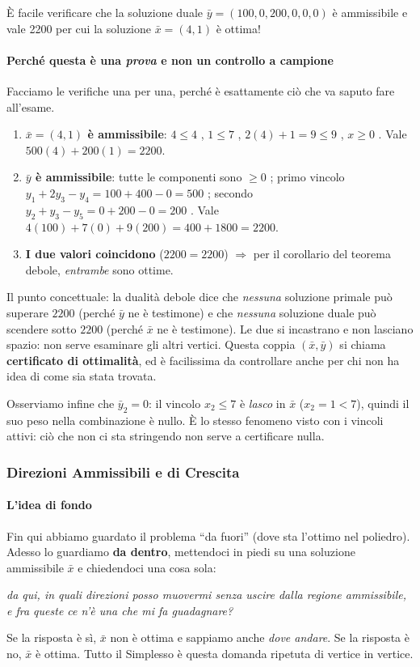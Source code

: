 \documentclass[12pt]{extarticle} %
\begin{document}
\noindent È facile verificare che la soluzione duale $\bar{y} = (100, 0, 200, 0, 0, 0)$ è ammissibile e vale 2200 per cui la soluzione $\bar{x} = (4, 1)$ è ottima!

\paragraph{Perché questa è una \emph{prova} e non un controllo a campione}
Facciamo le verifiche una per una, perché è esattamente ciò che va saputo fare all'esame.
\begin{enumerate}
    \item \textbf{$\bar{x}=(4,1)$ è ammissibile}: $4 \le 4$ \checkmark, $1 \le 7$ \checkmark, $2(4)+1 = 9 \le 9$ \checkmark, $x \ge 0$ \checkmark. Vale $500(4)+200(1) = 2200$.
    \item \textbf{$\bar{y}$ è ammissibile}: tutte le componenti sono $\ge 0$ \checkmark; primo vincolo $y_1 + 2y_3 - y_4 = 100 + 400 - 0 = 500$ \checkmark; secondo $y_2 + y_3 - y_5 = 0 + 200 - 0 = 200$ \checkmark. Vale $4(100)+7(0)+9(200) = 400 + 1800 = 2200$.
    \item \textbf{I due valori coincidono} ($2200 = 2200$) $\Rightarrow$ per il corollario del teorema debole, \emph{entrambe} sono ottime.
\end{enumerate}
Il punto concettuale: la dualità debole dice che \emph{nessuna} soluzione primale può superare $2200$ (perché $\bar{y}$ ne è testimone) e che \emph{nessuna} soluzione duale può scendere sotto $2200$ (perché $\bar{x}$ ne è testimone). Le due si incastrano e non lasciano spazio: non serve esaminare gli altri vertici. Questa coppia $(\bar{x},\bar{y})$ si chiama \textbf{certificato di ottimalità}, ed è facilissima da controllare anche per chi non ha idea di come sia stata trovata.

\noindent Osserviamo infine che $\bar{y}_2 = 0$: il vincolo $x_2 \le 7$ è \emph{lasco} in $\bar{x}$ ($x_2 = 1 < 7$), quindi il suo peso nella combinazione è nullo. È lo stesso fenomeno visto con i vincoli attivi: ciò che non ci sta stringendo non serve a certificare nulla.

\subsubsection{Direzioni Ammissibili e di Crescita}

\paragraph{L'idea di fondo}
Fin qui abbiamo guardato il problema ``da fuori'' (dove sta l'ottimo nel poliedro). Adesso lo guardiamo \textbf{da dentro}, mettendoci in piedi su una soluzione ammissibile $\bar{x}$ e chiedendoci una cosa sola:
\begin{center}
\emph{da qui, in quali direzioni posso muovermi senza uscire dalla regione ammissibile, e fra queste ce n'è una che mi fa guadagnare?}
\end{center}
Se la risposta è sì, $\bar{x}$ non è ottima e sappiamo anche \emph{dove andare}. Se la risposta è no, $\bar{x}$ è ottima. Tutto il Simplesso è questa domanda ripetuta di vertice in vertice.
\end{document}
